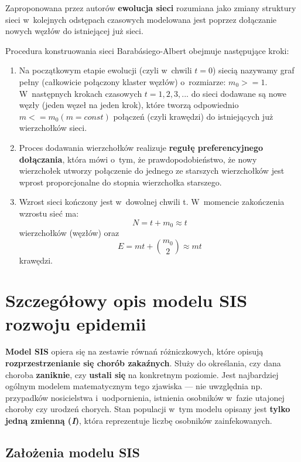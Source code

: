 Zaproponowana przez autorów \textbf{ewolucja sieci} rozumiana jako zmiany struktury sieci w~kolejnych odstępach czasowych modelowana jest poprzez dołączanie nowych węzłów do istniejącej już sieci. 

Procedura konstruowania sieci Barabásiego-Albert obejmuje następujące kroki:

\begin{enumerate}
\item Na początkowym etapie ewolucji (czyli w~chwili $t = 0$) siecią nazywamy graf pełny (całkowicie połączony klaster węzłów) o~rozmiarze: $m_0 >= 1$. W~następnych krokach czasowych $t = 1,2,3,...$ do sieci dodawane są nowe węzły (jeden węzeł na jeden krok), które tworzą odpowiednio $m <= m_0  (m = const)$ połączeń (czyli krawędzi) do istniejących już wierzchołków sieci.
\item Proces dodawania wierzchołków realizuje \textbf{regułę preferencyjnego dołączania}, która mówi o~tym, że prawdopodobieństwo, że nowy wierzchołek utworzy połączenie do jednego ze starszych wierzchołków jest wprost proporcjonalne do stopnia wierzchołka starszego.
\item Wzrost sieci kończony jest w~dowolnej chwili t. W~momencie zakończenia wzrostu sieć ma: \[N = t + m_0 \approx t \] wierzchołków (węzłów) oraz \[ E = mt + \binom{m_0}{2} \approx mt \] krawędzi.
\end{enumerate}


\section{Szczegółowy opis modelu SIS rozwoju epidemii}
\label{sec:szczegolowy_opis_modelu_sis_rozwoju_epidemii}

\textbf{Model SIS} opiera się na zestawie równań różniczkowych, które opisują \textbf{rozprzestrzenianie się chorób zakaźnych}. Służy do określania, czy dana choroba \textbf{zaniknie}, czy \textbf{ustali się} na konkretnym poziomie. Jest najbardziej ogólnym modelem matematycznym tego zjawiska --- nie uwzględnia np. przypadków nosicielstwa i~uodpornienia, istnienia osobników w~fazie utajonej choroby czy urodzeń chorych. Stan populacji w~tym modelu opisany jest \textbf{tylko jedną zmienną (\textit{I})}, która reprezentuje liczbę osobników zainfekowanych.

\subsection{Założenia modelu SIS}
\label{subsec:zalozenia_modelu_sis}

